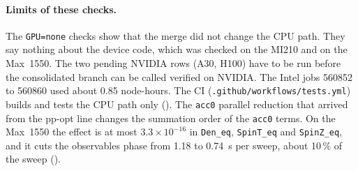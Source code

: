 \paragraph{Limits of these checks.} The \texttt{GPU=none} checks show that the merge did not change the CPU path. They say nothing about the device code, which was checked on the MI210 and on the Max~1550. The two pending NVIDIA rows (A30, H100) have to be run before the consolidated branch can be called verified on NVIDIA. The Intel jobs 560852 to 560860 used about 0.85 node-hours. The CI (\texttt{.github/workflows/tests.yml}) builds and tests the CPU path only (). The \texttt{acc0} parallel reduction that arrived from the pp-opt line changes the summation order of the \texttt{acc0} terms. On the Max~1550 the effect is at most $3.3\times10^{-16}$ in \texttt{Den\_eq}, \texttt{SpinT\_eq} and \texttt{SpinZ\_eq}, and it cuts the observables phase from 1.18 to 0.74~s per sweep, about 10\,\% of the sweep ().
